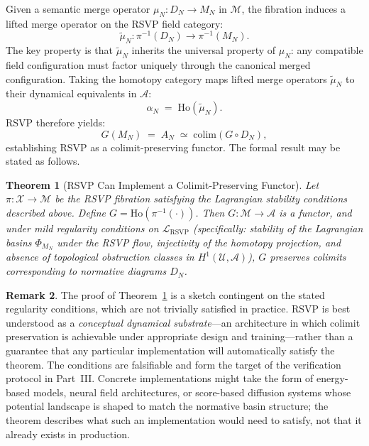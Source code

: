 \documentclass[12pt]{article}
\newtheorem{theorem}{Theorem}[section]
\theoremstyle{definition}
\newtheorem{remark}[theorem]{Remark}
\begin{document}
Given a semantic merge operator $\mu_N : D_N \to M_N$ in $\mathcal{M}$, the
fibration induces a lifted merge operator on the RSVP field category:
\begin{equation}
  \tilde{\mu}_N : \pi^{-1}(D_N) \to \pi^{-1}(M_N).
\end{equation}
The key property is that $\tilde{\mu}_N$ inherits the universal property of
$\mu_N$: any compatible field configuration must factor uniquely through the
canonical merged configuration. Taking the homotopy category maps lifted merge
operators $\tilde{\mu}_N$ to their dynamical equivalents in $\mathcal{A}$:
\begin{equation}
  \alpha_N \;=\; \mathrm{Ho}(\tilde{\mu}_N).
\end{equation}
RSVP therefore yields:
\begin{equation}
  G(M_N) \;=\; A_N \;\simeq\; \mathrm{colim}(G \circ D_N),
\end{equation}
establishing RSVP as a colimit-preserving functor. The formal result may be
stated as follows.

\begin{theorem}[RSVP Can Implement a Colimit-Preserving Functor]
\label{thm:rsvp}
Let $\pi : \mathcal{X} \to \mathcal{M}$ be the RSVP fibration satisfying the
Lagrangian stability conditions described above. Define $G =
\mathrm{Ho}(\pi^{-1}(\cdot))$. Then $G : \mathcal{M} \to \mathcal{A}$ is a
functor, and under mild regularity conditions on $\mathcal{L}_{\mathrm{RSVP}}$
(specifically: stability of the Lagrangian basins $\Phi_{M_N}$ under the RSVP
flow, injectivity of the homotopy projection, and absence of topological
obstruction classes in $H^1(\mathcal{U}, \mathcal{A})$), $G$ preserves colimits
corresponding to normative diagrams $D_N$.
\end{theorem}

\begin{remark}
The proof of Theorem~\ref{thm:rsvp} is a sketch contingent on the stated
regularity conditions, which are not trivially satisfied in practice. RSVP is
best understood as a \emph{conceptual dynamical substrate}---an architecture in
which colimit preservation is achievable under appropriate design and
training---rather than a guarantee that any particular implementation will
automatically satisfy the theorem. The conditions are falsifiable and form the
target of the verification protocol in Part~III. Concrete implementations might
take the form of energy-based models, neural field architectures, or
score-based diffusion systems whose potential landscape is shaped to match the
normative basin structure; the theorem describes what such an implementation
would need to satisfy, not that it already exists in production.
\end{remark}
\end{document}

